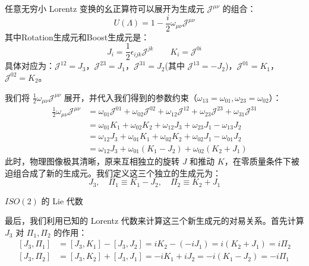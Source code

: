 \vspace{2ex}
任意无穷小 Lorentz 变换的幺正算符可以展开为生成元 $\mathscr{J}^{\mu\nu}$ 的组合：
\begin{equation}
    U(\Lambda) = 1 - \frac{i}{2} \omega_{\mu\nu} \mathscr{J}^{\mu\nu}
\end{equation}
其中Rotation生成元和Boost生成元是：
\begin{equation}
    J_i = \frac{1}{2}\epsilon_{ijk}\mathscr{J}^{jk}\qquad
    K_i =\mathscr{J}^{0i}
\end{equation}
具体对应为：$\mathscr{J}^{12} = J_3$，$\mathscr{J}^{23} = J_1$，$\mathscr{J}^{31} = J_2$(其中 $\mathscr{J}^{13} = -J_2$)，$\mathscr{J}^{01} = K_1$，$\mathscr{J}^{02} = K_2$。
\vspace{2ex}
\par
我们将 $\frac{1}{2} \omega_{\mu\nu} \mathscr{J}^{\mu\nu}$ 展开，并代入我们得到的参数约束（$\omega_{13}=\omega_{01}, \omega_{23}=\omega_{02}$）：
\begin{align}
    \frac{1}{2} \omega_{\mu\nu} \mathscr{J}^{\mu\nu} &= \omega_{01}\mathscr{J}^{01} + \omega_{02}\mathscr{J}^{02} + \omega_{12}\mathscr{J}^{12} + \omega_{23}\mathscr{J}^{23} + \omega_{31}\mathscr{J}^{31} \nonumber \\
    &= \omega_{01}K_1 + \omega_{02}K_2 + \omega_{12}J_3 + \omega_{23}J_1 - \omega_{13}J_2 \nonumber \\
    &= \omega_{12}J_3 + \omega_{01}K_1 + \omega_{02}K_2 + \omega_{02}J_1 - \omega_{01}J_2 \nonumber \\
    &= \omega_{12} J_3 + \omega_{01} (K_1 - J_2) + \omega_{02} (K_2 + J_1)
\end{align}\label{massless_lorentz_transf}
此时，物理图像极其清晰，原来互相独立的旋转 $J$ 和推动 $K$，在零质量条件下被迫组合成了新的生成元。我们定义这三个独立的生成元为：
\begin{equation}
    J_3, \quad \Pi_1 \equiv K_1 - J_2, \quad \Pi_2 \equiv K_2 + J_1
\end{equation}
\vspace{2ex}
\begin{center}
  \large  $ISO(2)$ 的 Lie 代数
\end{center}
\vspace{2ex}
最后，我们利用已知的 Lorentz 代数来计算这三个新生成元的对易关系。首先计算 $J_3$ 对 $\Pi_1, \Pi_2$ 的作用：
\begin{subequations}
    \begin{align}
    [J_3, \Pi_1] &= [J_3, K_1] - [J_3, J_2] = iK_2 - (-iJ_1) = i(K_2 + J_1) = i\Pi_2 \\
    [J_3, \Pi_2] &= [J_3, K_2] + [J_3, J_1] = -iK_1 + iJ_2 = -i(K_1 - J_2) = -i\Pi_1
\end{align}
\end{subequations}
